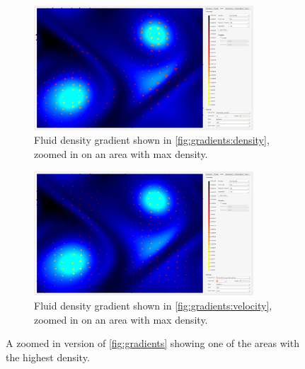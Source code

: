 \begin{figure}[tbh]
	\centering
	\begin{subfigure}{0.45\textwidth}
		\centering
		\includegraphics[width=0.9\textwidth, trim={35px 30px 1076px 500px}, clip]{img/gradient/fluid_density_gradient}
		\caption{Fluid density gradient shown in \cref{fig:gradients:density}, zoomed in on an area with max density.}
		\label{fig:gradients:zoom:density}
	\end{subfigure}
	\hspace{30px}
	\begin{subfigure}{0.45\textwidth}	
		\centering
		\includegraphics[width=0.9\textwidth, trim={35px 30px 1076px 500px}, clip]{img/gradient/fluid_velocity_gradient}
		\caption{Fluid density gradient shown in \cref{fig:gradients:velocity}, zoomed in on an area with max density.}
		\label{fig:gradients:zoom:velocity}
	\end{subfigure}
	\caption{A zoomed in version of \cref{fig:gradients} showing one of the areas with the highest density.}
	\label{fig:gradients:zoom}
\end{figure}